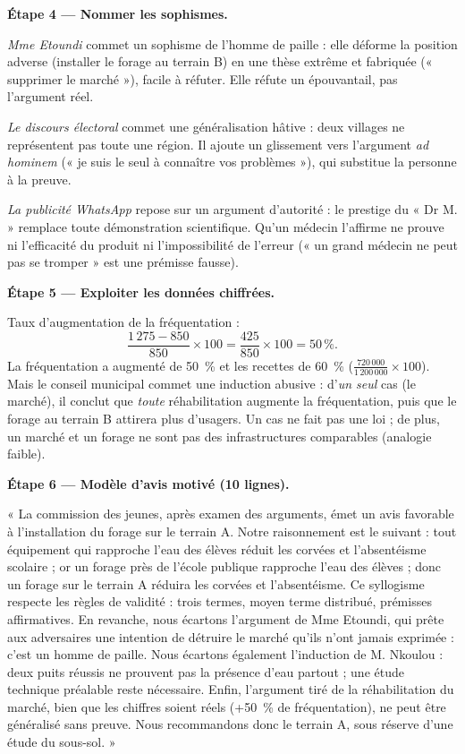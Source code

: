 \documentclass[11pt]{article}
\newcommand{\cle}[1]{{\popxbold\color{popdark}#1}}
\begin{document}
\begin{exoresolu}
\textbf{Étape 4 — Nommer les sophismes.}

\emph{Mme Etoundi} commet un \cle{sophisme de l'homme de paille} : elle déforme la position adverse (installer le forage au terrain B) en une thèse extrême et fabriquée (« supprimer le marché »), facile à réfuter. Elle réfute un épouvantail, pas l'argument réel.

\emph{Le discours électoral} commet une \cle{généralisation hâtive} : deux villages ne représentent pas toute une région. Il ajoute un glissement vers l'argument \emph{ad hominem} (« je suis le seul à connaître vos problèmes »), qui substitue la personne à la preuve.

\emph{La publicité WhatsApp} repose sur un \cle{argument d'autorité} : le prestige du « Dr M. » remplace toute démonstration scientifique. Qu'un médecin l'affirme ne prouve ni l'efficacité du produit ni l'impossibilité de l'erreur (« un grand médecin ne peut pas se tromper » est une prémisse fausse).

\textbf{Étape 5 — Exploiter les données chiffrées.}

Taux d'augmentation de la fréquentation :
\[
\frac{1\,275-850}{850}\times 100 = \frac{425}{850}\times 100 = 50\,\%.
\]
La fréquentation a augmenté de 50~\% et les recettes de 60~\% ($\frac{720\,000}{1\,200\,000}\times 100$). Mais le conseil municipal commet une \cle{induction abusive} : d'\emph{un seul} cas (le marché), il conclut que \emph{toute} réhabilitation augmente la fréquentation, puis que le forage au terrain B attirera plus d'usagers. Un cas ne fait pas une loi ; de plus, un marché et un forage ne sont pas des infrastructures comparables (analogie faible).

\textbf{Étape 6 — Modèle d'avis motivé (10 lignes).}

« La commission des jeunes, après examen des arguments, émet un avis favorable à l'installation du forage sur le terrain A. Notre raisonnement est le suivant : tout équipement qui rapproche l'eau des élèves réduit les corvées et l'absentéisme scolaire ; or un forage près de l'école publique rapproche l'eau des élèves ; donc un forage sur le terrain A réduira les corvées et l'absentéisme. Ce syllogisme respecte les règles de validité : trois termes, moyen terme distribué, prémisses affirmatives. En revanche, nous écartons l'argument de Mme Etoundi, qui prête aux adversaires une intention de détruire le marché qu'ils n'ont jamais exprimée : c'est un homme de paille. Nous écartons également l'induction de M. Nkoulou : deux puits réussis ne prouvent pas la présence d'eau partout ; une étude technique préalable reste nécessaire. Enfin, l'argument tiré de la réhabilitation du marché, bien que les chiffres soient réels (+50~\% de fréquentation), ne peut être généralisé sans preuve. Nous recommandons donc le terrain A, sous réserve d'une étude du sous-sol. »
\end{exoresolu}
\end{document}
